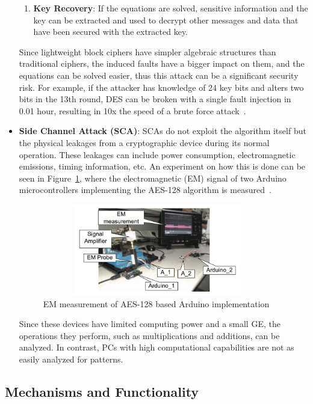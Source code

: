 \begin{itemize}
\begin{enumerate}
        \item \textbf{Key Recovery}: If the equations are solved, sensitive information and the key can be extracted and used to decrypt other messages and data that have been secured with the extracted key.
    \end{enumerate}
    Since lightweight block ciphers have simpler algebraic structures than traditional ciphers, the induced faults have a bigger impact on them, and the equations can be solved easier, thus this attack can be a significant security risk. For example, if the attacker has knowledge of 24 key bits and alters two bits in the 13th round, DES can be broken with a single fault injection in 0.01 hour, resulting in 10x the speed of a brute force attack~\cite{zhang2016framework}.
    \item \textbf{Side Channel Attack (SCA)}: SCAs do not exploit the algorithm itself but the physical leakages from a cryptographic device during its normal operation. These leakages can include power consumption, electromagnetic emissions, timing information, etc. An experiment on how this is done can be seen in Figure~\ref{fig:em_measurment}, where the electromagnetic (EM) signal of two Arduino microcontrollers implementing the AES-128 algorithm is measured~\cite{pammu2016interceptive}.
    
        \begin{figure}[h]
            \centering
            \includegraphics[width=10cm, height=4cm]{media/em_measurment.png}
            \caption{EM measurement of AES-128 based Arduino implementation}
            \label{fig:em_measurment}
        \end{figure}

    Since these devices have limited computing power and a small GE, the operations they perform, such as multiplications and additions, can be analyzed. In contrast, PCs with high computational capabilities are not as easily analyzed for patterns.
    \end{itemize}



\subsection{Mechanisms and Functionality}


